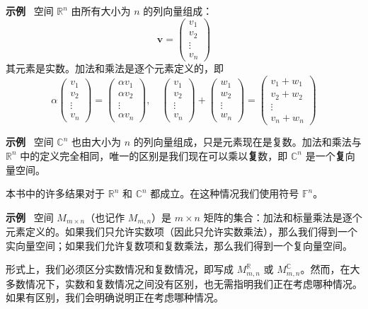 \textbf{示例}~ 空间 $\mathbb{R}^n$ 由所有大小为 $n$ 的列向量组成：
$$
\mathbf{v} = \begin{pmatrix} v_1 \\ v_2 \\ \vdots \\ v_n \end{pmatrix}
$$
其元素是实数。加法和乘法是逐个元素定义的，即
$$
\alpha \begin{pmatrix} v_1 \\ v_2 \\ \vdots \\ v_n \end{pmatrix} = \begin{pmatrix} \alpha v_1 \\ \alpha v_2 \\ \vdots \\ \alpha v_n \end{pmatrix}, \quad \begin{pmatrix} v_1 \\ v_2 \\ \vdots \\ v_n \end{pmatrix} + \begin{pmatrix} w_1 \\ w_2 \\ \vdots \\ w_n \end{pmatrix} = \begin{pmatrix} v_1 + w_1 \\ v_2 + w_2 \\ \vdots \\ v_n + w_n \end{pmatrix}
$$

\textbf{示例}~ 空间 $\mathbb{C}^n$ 也由大小为 $n$ 的列向量组成，只是元素现在是复数。加法和乘法与 $\mathbb{R}^n$ 中的定义完全相同，唯一的区别是我们现在可以乘以\textbf{复}数，即 $\mathbb{C}^n$ 是一个\textbf{复}向量空间。

本书中的许多结果对于 $\mathbb{R}^n$ 和 $\mathbb{C}^n$ 都成立。在这种情况我们使用符号 $\mathbb{F}^n$。

\textbf{示例}~ 空间 $M_{m \times n}$（也记作 $M_{m,n}$）是 $m \times n$ 矩阵的集合：加法和标量乘法是逐个元素定义的。如果我们只允许实数项（因此只允许实数乘法），那么我们得到一个实向量空间；如果我们允许复数项和复数乘法，那么我们得到一个复向量空间。

形式上，我们必须区分实数情况和复数情况，即写成 $M^{\mathbb{R}}_{m,n}$ 或 $M^{\mathbb{C}}_{m,n}$。然而，在大多数情况下，实数和复数情况之间没有区别，也无需指明我们正在考虑哪种情况。如果有区别，我们会明确说明正在考虑哪种情况。

